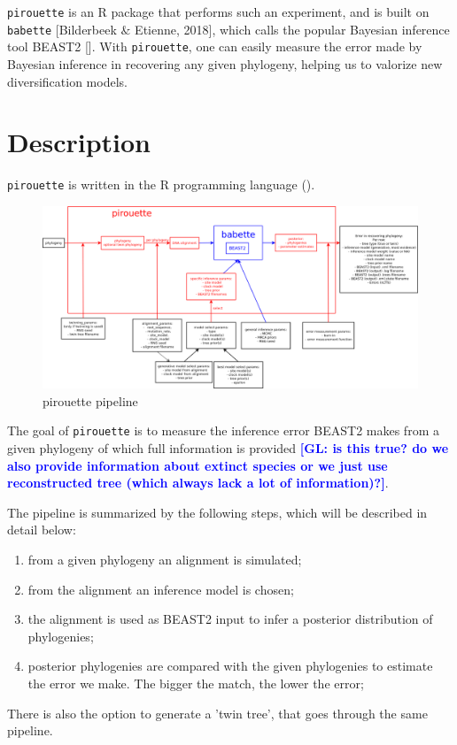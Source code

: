 \documentclass{article}
\newcommand{\giovanni}[1]{\textcolor{blue}{\textbf{[GL: #1]}}}
\begin{document}
\verb;pirouette; is an R package that performs such an experiment,
and is built on \verb;babette; [Bilderbeek $\&$ Etienne, 2018], 
which calls the popular Bayesian inference tool 
BEAST2 [\cite{bouckaert2014beast}]. With \verb;pirouette;, one
can easily measure the error made by Bayesian inference in recovering
any given phylogeny, helping us to valorize new diversification models.

\section{Description}

\verb;pirouette; is written in the R programming language (\cite{R}).

\begin{figure}
  \centering
  \includegraphics[width=\textwidth]{overview.png}
  \caption{pirouette pipeline}
  \label{fig:pipeline}
\end{figure}

The goal of \verb;pirouette; is to measure the inference error BEAST2
makes from a given phylogeny of which full information is provided \giovanni{is this true? do we also provide information about extinct species or we just use reconstructed tree (which always lack a lot of information)?}.

The pipeline is summarized by the following steps, which will be described in detail below:
\begin{enumerate}
    \item from a given phylogeny an alignment is simulated;
    \item from the alignment an inference model is chosen;
    \item the alignment is used as BEAST2 input to infer a posterior distribution of phylogenies;
    \item posterior phylogenies are compared with the given phylogenies to estimate the error we make. The bigger the match, the lower the error;
\end{enumerate}
There is also the option to generate a 'twin tree',
that goes through the same pipeline.
\end{document}
